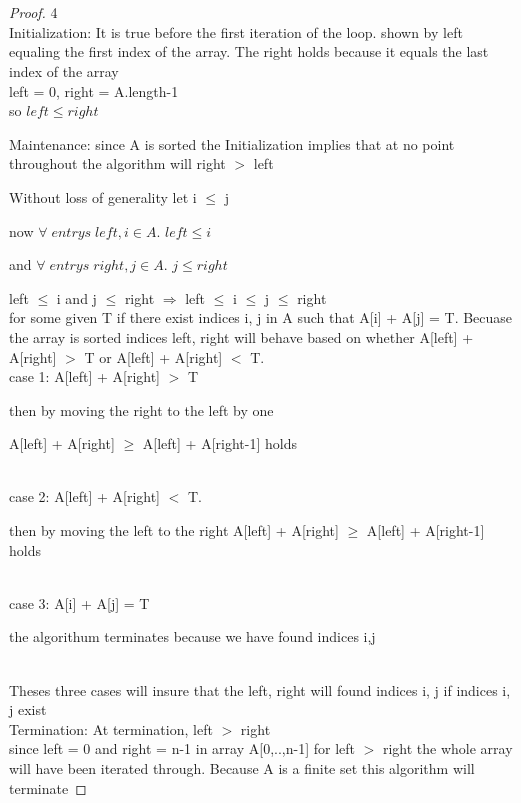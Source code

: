 \documentclass[12pt]{article}
\begin{document}
\section{} %
\begin{proof} 4\\
Initialization: It is true before the first iteration of the loop.
shown by left equaling the first index of the array. The right holds because it equals the last index of the array\\
left = 0, right = A.length-1\\ so $left \leq right$


Maintenance: since A is sorted the Initialization implies that at no point throughout the algorithm will right $>$ left

Without loss of generality let i $\leq$ j 

now $\forall \; entrys \; left, i \in A.$ $left \leq i$ 

and $\forall \; entrys \; right, j \in A.$ $j \leq right$

left $\leq$ i and j $\leq$ right $\Rightarrow$
left $\leq$ i $\leq$ j $\leq$ right\\
for some given T if there exist indices i, j in A such that A[i] + A[j] = T. Becuase the array is sorted indices left, right will behave based on whether A[left] + A[right] $>$ T or A[left] + A[right] $<$ T.\\

case 1: A[left] + A[right] $>$ T

\begin{minipage}{\dimexpr\textwidth-3cm}
then by moving the right to the left by one  

A[left] + A[right]  $\geq$ A[left] + A[right-1] holds  
\end{minipage}\\


case 2: A[left] + A[right] $<$ T.

\begin{minipage}{\dimexpr\textwidth-3cm}
then by moving the left to the right  A[left] + A[right]  $\geq$ A[left] + A[right-1] holds  
\end{minipage}\\

case 3: A[i] + A[j] = T

\begin{minipage}{\dimexpr\textwidth-3cm}
the algorithum terminates because we have found indices i,j
\end{minipage}\\

Theses three cases will insure that the left, right will found indices i, j if indices i, j exist
\\

Termination: At termination, left $>$ right\\ 
since left = 0 and right = n-1 in array A[0,..,n-1] for left $>$ right the whole array will have been iterated through. Because A is a finite set this algorithm will terminate 
\end{proof}
\end{document}
